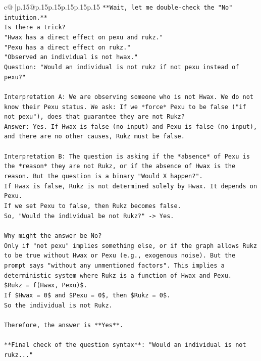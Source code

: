 \documentclass{article}
\begin{document}
{\begin{supertabular}{c@{$\;$}|p{.15\linewidth}@{}p{.15\linewidth}p{.15\linewidth}p{.15\linewidth}p{.15\linewidth}p{.15\linewidth}}
{{{\texttt{**Wait, let me double{-}check the "No" intuition.**} \\
\texttt{Is there a trick?} \\
\texttt{"Hwax has a direct effect on pexu and rukz."} \\
\texttt{"Pexu has a direct effect on rukz."} \\
\texttt{"Observed an individual is not hwax."} \\
\texttt{Question: "Would an individual is not rukz if not pexu instead of pexu?"} \\
\\ 
\texttt{Interpretation A: We are observing someone who is not Hwax. We do not know their Pexu status. We ask: If we *force* Pexu to be false ("if not pexu"), does that guarantee they are not Rukz?} \\
\texttt{Answer: Yes. If Hwax is false (no input) and Pexu is false (no input), and there are no other causes, Rukz must be false.} \\
\\ 
\texttt{Interpretation B: The question is asking if the *absence* of Pexu is the *reason* they are not Rukz, or if the absence of Hwax is the reason. But the question is a binary "Would X happen?".} \\
\texttt{If Hwax is false, Rukz is not determined solely by Hwax. It depends on Pexu.} \\
\texttt{If we set Pexu to false, then Rukz becomes false.} \\
\texttt{So, "Would the individual be not Rukz?" {-}> Yes.} \\
\\ 
\texttt{Why might the answer be No?} \\
\texttt{Only if "not pexu" implies something else, or if the graph allows Rukz to be true without Hwax or Pexu (e.g., exogenous noise). But the prompt says "without any unmentioned factors". This implies a deterministic system where Rukz is a function of Hwax and Pexu.} \\
\texttt{\$Rukz = f(Hwax, Pexu)\$.} \\
\texttt{If \$Hwax = 0\$ and \$Pexu = 0\$, then \$Rukz = 0\$.} \\
\texttt{So the individual is not Rukz.} \\
\\ 
\texttt{Therefore, the answer is **Yes**.} \\
\\ 
\texttt{**Final check of the question syntax**: "Would an individual is not rukz..."} \\
}}}
\end{supertabular}}
\end{document}
